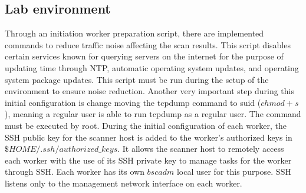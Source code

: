 \subsection{Lab environment}

Through an initiation worker preparation script, there are implemented commands to reduce traffic noise affecting the scan results. This script disables certain services known for querying servers on the internet for the purpose of updating time through NTP, automatic operating system updates, and operating system package updates. This script must be run during the setup of the environment to ensure noise reduction. Another very important step during this initial configuration is change moving the tcpdump command to suid ($chmod +s$), meaning a regular user is able to run tcpdump as a regular user. The command must be executed by root. During the initial configuration of each worker, the SSH public key for the scanner host is added to the worker's authorized keys in $\$HOME/.ssh/authorized\_keys$. It allows the scanner host to remotely access each worker with the use of its SSH private key to manage tasks for the worker through SSH. Each worker has its own $bscadm$ local user for this purpose. SSH listens only to the management network interface on each worker.